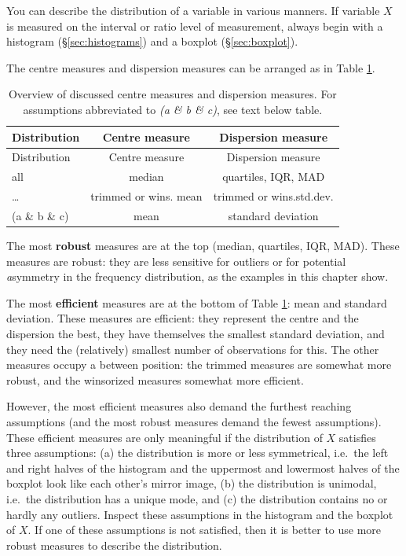 \documentclass[
]{book}
\begin{document}
You can describe the distribution of a variable in various
manners.
If variable \(X\) is measured on the interval or ratio level of measurement,
always begin with a histogram (§\ref{sec:histograms})
and a boxplot (§\ref{sec:boxplot}).

The centre measures and dispersion measures can be arranged
as in Table \ref{tab:centredispersionmeasures}.

\begin{longtable}[]{@{}lcc@{}}
\caption{\label{tab:centredispersionmeasures} Overview of discussed centre measures and dispersion measures. For assumptions abbreviated to \emph{(a \& b \& c)}, see text below table.}\tabularnewline
\toprule
Distribution & Centre measure & Dispersion measure\tabularnewline
\midrule
\endfirsthead
\toprule
Distribution & Centre measure & Dispersion measure\tabularnewline
\midrule
\endhead
all & median & quartiles, IQR, MAD\tabularnewline
\ldots{} & trimmed or wins. mean & trimmed or wins.std.dev.\tabularnewline
(a \& b \& c) & mean & standard deviation\tabularnewline
\bottomrule
\end{longtable}

The most \textbf{robust} measures are
at the top (median, quartiles, IQR, MAD). These measures are robust:
they are less sensitive for outliers or for potential \emph{a}symmetry in the
frequency distribution, as the examples in this chapter show.

The most \textbf{efficient} measures are at the bottom of
Table \ref{tab:centredispersionmeasures}: mean and standard deviation.
These measures are efficient: they represent the centre and the dispersion
the best, they have themselves the smallest standard deviation, and they need
the (relatively) smallest number of observations for this. The other measures
occupy a between position: the trimmed measures are somewhat more robust,
and the winsorized measures somewhat more efficient.

However, the most efficient measures also demand the furthest reaching
assumptions (and the most robust measures demand the fewest assumptions).
These efficient measures are only meaningful if the distribution of \(X\)
satisfies three assumptions: (a) the distribution is more or less
symmetrical, i.e.~the left and right halves of the histogram and
the uppermost and lowermost halves of the boxplot look like each other's
mirror image, (b) the distribution is unimodal, i.e.~the distribution has
a unique mode, and (c) the distribution contains no or hardly any outliers.
Inspect these assumptions in the histogram and the boxplot of \(X\). If one
of these assumptions is not satisfied, then it is better to use
more robust measures to describe the distribution.
\end{document}
